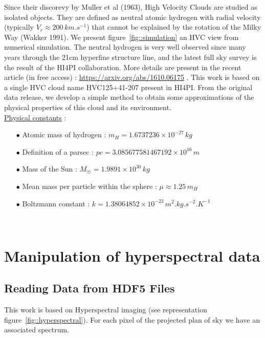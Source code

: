 \documentclass[a4paper,10.5pt]{report}
\begin{document}
Since their discorevy by Muller et al (1963), High Velocity Clouds are studied as isolated objects. They are defined 
as neutral atomic hydrogen with radial velocity (typically $ V_r \approx 200 \, km.s^{-1}$) that cannot be explained by the rotation 
of the Milky Way (Wakker 1991). We present figure~\ref{fig::simulation} an HVC view from numerical simulation. 
The neutral hydrogen is very well observed since many years through the 21cm hyperfine structure line, and the latest full sky survey 
is the result of the HI4PI collaboration. More details are present in the recent article (in free access) : 
\color{blue} \url{https://arxiv.org/abs/1610.06175} \color{black}. 
This work is based on a single HVC cloud name HVC125+41-207 present in HI4PI. From the original data release, we develop a simple
method to obtain some approximations of the physical properties of this cloud and its environment. \\

\newpage 
\noindent
\underline{Physical constants} : \\
\begin{itemize}
\item[$\bullet$] Atomic mass of hydrogen : $m_H = 1.6737236 \times 10^{-27} \, kg$ 
\item[$\bullet$] Definition of a parsec : $pc = 3.085677581467192 \times 10^{16} \, m$
\item[$\bullet$] Mass of the Sun : $M_{\astrosun} = 1.9891 \times 10^{30} \, kg$
\item[$\bullet$] Mean mass per particle within the sphere : $\mu \approx 1.25 \, m_H$
\item[$\bullet$] Boltzmann constant : $k = 1.38064852 \times 10^{-23} \, m^2.kg.s^{-2}.K^{-1}$ 
\end{itemize} \\

\chapter{Manipulation of hyperspectral data}
\section{Reading Data from HDF5 Files}
This work is based on Hyperspectral imaging (see representation figure~\ref{fig::hyperspectral}). 
For each pixel of the projected plan of sky we have an associated spectrum. \\
\end{document}
